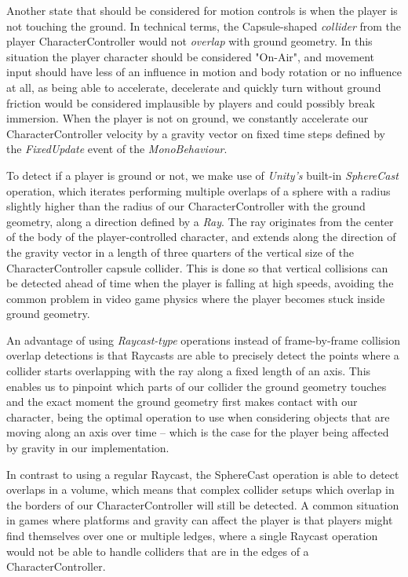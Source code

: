 Another state that should be considered for motion controls is when the player is not touching the ground. In technical terms, the Capsule-shaped \emph{collider} from the player CharacterController would not \emph{overlap} with ground geometry. In this situation the player character should be considered "On-Air", and movement input should have less of an influence in motion and body rotation or no influence at all, as being able to accelerate, decelerate and quickly turn without ground friction would be considered implausible by players and could possibly break immersion. When the player is not on ground, we constantly accelerate our CharacterController velocity by a gravity vector on fixed time steps defined by the \emph{FixedUpdate} event of the \emph{MonoBehaviour}.


To detect if a player is ground or not, we make use of \emph{Unity's} built-in \emph{SphereCast} operation, which iterates performing multiple overlaps of a sphere with a radius slightly higher than the radius of our CharacterController with the ground geometry, along a direction defined by a \emph{Ray}. The ray originates from the center of the body of the player-controlled character, and extends along the direction of the gravity vector in a length of three quarters of the vertical size of the CharacterController capsule collider. This is done so that vertical collisions can be detected ahead of time when the player is falling at high speeds, avoiding the common problem in video game physics where the player becomes stuck inside ground geometry.



An advantage of using \emph{Raycast-type} operations instead of frame-by-frame collision overlap detections is that Raycasts are able to precisely detect the points where a collider starts overlapping with the ray along a fixed length of an axis. This enables us to pinpoint which parts of our collider the ground geometry touches and the exact moment the ground geometry first makes contact with our character, being the optimal operation to use when considering objects that are moving along an axis over time -- which is the case for the player being affected by gravity in our implementation.

In contrast to using a regular Raycast, the SphereCast operation is able to detect overlaps in a volume, which means that complex collider setups which overlap in the borders of our CharacterController will still be detected. A common situation in games where platforms and gravity can affect the player is that players might find themselves over one or multiple ledges, where a single Raycast operation would not be able to handle colliders that are in the edges of a CharacterController.

